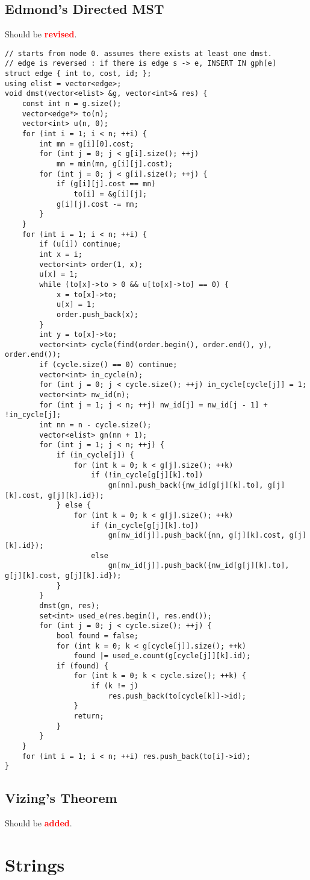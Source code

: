 \documentclass[landscape, 8pt, a4paper, oneside, twocolumn]{extarticle}
\newcommand{\revised}{Should be \textcolor{red}{\textbf{revised}}.}
\newcommand{\added}{Should be \textcolor{red}{\textbf{added}}.}
\begin{document}
\subsection {Edmond's Directed MST}
\revised
\begin{verbatim}
// starts from node 0. assumes there exists at least one dmst.
// edge is reversed : if there is edge s -> e, INSERT IN gph[e]
struct edge { int to, cost, id; };
using elist = vector<edge>;
void dmst(vector<elist> &g, vector<int>& res) {
	const int n = g.size();
	vector<edge*> to(n);
	vector<int> u(n, 0);
	for (int i = 1; i < n; ++i) {
		int mn = g[i][0].cost;
		for (int j = 0; j < g[i].size(); ++j)
			mn = min(mn, g[i][j].cost);
		for (int j = 0; j < g[i].size(); ++j) {
			if (g[i][j].cost == mn)
				to[i] = &g[i][j];
			g[i][j].cost -= mn;
		}
	}
	for (int i = 1; i < n; ++i) {
		if (u[i]) continue;
		int x = i;
		vector<int> order(1, x);
		u[x] = 1;
		while (to[x]->to > 0 && u[to[x]->to] == 0) {
			x = to[x]->to;
			u[x] = 1;
			order.push_back(x);
		}
		int y = to[x]->to;
		vector<int> cycle(find(order.begin(), order.end(), y), order.end());
		if (cycle.size() == 0) continue;
		vector<int> in_cycle(n);
		for (int j = 0; j < cycle.size(); ++j) in_cycle[cycle[j]] = 1;
		vector<int> nw_id(n);
		for (int j = 1; j < n; ++j) nw_id[j] = nw_id[j - 1] + !in_cycle[j];
		int nn = n - cycle.size();
		vector<elist> gn(nn + 1);
		for (int j = 1; j < n; ++j) {
			if (in_cycle[j]) {
				for (int k = 0; k < g[j].size(); ++k)
					if (!in_cycle[g[j][k].to])
						gn[nn].push_back({nw_id[g[j][k].to], g[j][k].cost, g[j][k].id});
			} else {
				for (int k = 0; k < g[j].size(); ++k)
					if (in_cycle[g[j][k].to])
						gn[nw_id[j]].push_back({nn, g[j][k].cost, g[j][k].id});
					else
						gn[nw_id[j]].push_back({nw_id[g[j][k].to], g[j][k].cost, g[j][k].id});
			}
		}
		dmst(gn, res);
		set<int> used_e(res.begin(), res.end());
		for (int j = 0; j < cycle.size(); ++j) {
			bool found = false;
			for (int k = 0; k < g[cycle[j]].size(); ++k)
				found |= used_e.count(g[cycle[j]][k].id);
			if (found) {
				for (int k = 0; k < cycle.size(); ++k) {
					if (k != j)
						res.push_back(to[cycle[k]]->id);
				}
				return;
			}
		}
	}
	for (int i = 1; i < n; ++i) res.push_back(to[i]->id);
}
\end{verbatim}
\subsection {Vizing's Theorem}
\added
\section{Strings}
\end{document}
